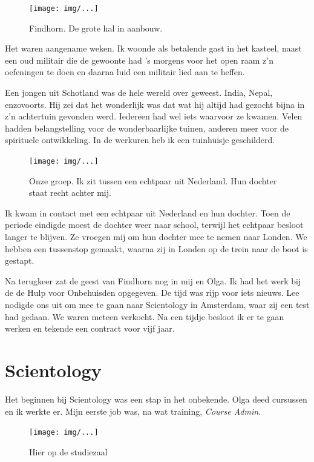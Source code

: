 \documentclass[12pt,twoside, openright]{memoir}
\begin{document}
\begin{figure}[t]
\texttt{[image: img/...]}
\caption{Findhorn. De grote hal in aanbouw.}
\end{figure}

Het waren aangename weken. Ik woonde als betalende gast in het kasteel, naast een oud militair die de gewoonte had ’s morgens voor het open raam z’n oefeningen te doen en daarna luid een militair lied aan te heffen. 

Een jongen uit Schotland was de hele wereld over geweest. India, Nepal, enzovoorts. Hij zei dat het wonderlijk was dat wat hij altijd had gezocht bijna in z’n achtertuin gevonden werd. Iedereen had wel iets waarvoor ze kwamen. Velen hadden belangstelling voor de wonderbaarlijke tuinen, anderen meer voor de spirituele ontwikkeling. In de werkuren heb ik een tuinhuisje geschilderd. 

\begin{figure}[t]
\texttt{[image: img/...]}
\caption{Onze groep. Ik zit tussen een echtpaar uit Nederland. Hun dochter staat recht achter mij.}
\end{figure}

Ik kwam in contact met een echtpaar uit Nederland en hun dochter. Toen de periode eindigde moest de dochter weer naar school, terwijl het echtpaar besloot langer te blijven. Ze vroegen mij om hun dochter mee te nemen naar Londen. We hebben een tussenstop gemaakt, waarna zij in Londen op de trein naar de boot is gestapt.

Na terugkeer zat de geest van Findhorn nog in mij en Olga. Ik had het werk bij de de Hulp voor Onbehuisden opgegeven. De tijd was rijp voor iets nieuws. Lee nodigde ons uit om mee te gaan naar Scientology in Amsterdam, waar zij een test had gedaan. We waren meteen verkocht. Na een tijdje besloot ik er te gaan werken en tekende een contract voor vijf jaar. 

\chapter{Scientology} %
\label{cha:scientologu}

Het beginnen bij Scientology was een stap in het onbekende. Olga deed cursussen en ik werkte er. Mijn eerste job was, na wat training, \emph{Course Admin}. 

\begin{figure}[t]
\texttt{[image: img/...]}
\caption{Hier op de studiezaal}
\end{figure}
\end{document}
